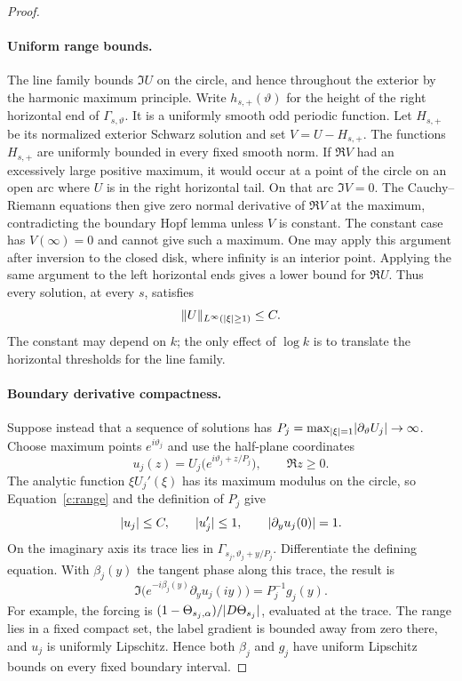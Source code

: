 \begin{proof}
\paragraph{Uniform range bounds.}
The line family bounds $\Im U$ on the circle, and hence throughout the
exterior by the harmonic maximum principle.  Write
$h_{s,+}(\vartheta)$ for the height of the right horizontal end of
$\Gamma_{s,\vartheta}$.  It is a uniformly smooth odd periodic function.
Let $H_{s,+}$ be its normalized exterior Schwarz solution and set
$V=U-H_{s,+}$.  The functions $H_{s,+}$ are uniformly bounded in every
fixed smooth norm.  If $\Re V$ had an excessively large positive
maximum, it would occur at a point of the circle on an open arc where
$U$ is in the right horizontal tail.  On that arc $\Im V=0$.
The Cauchy--Riemann equations then give zero normal derivative of
$\Re V$ at the maximum, contradicting the boundary Hopf lemma unless
$V$ is constant.  The constant case has $V(\infty)=0$ and cannot give
such a maximum.  One may apply this argument after inversion to the
closed disk, where infinity is an interior point.  Applying the same
argument to the left horizontal ends gives a lower bound for $\Re U$.
Thus every solution, at every $s$, satisfies
\begin{equation}\label{c:range}
 \lVert U\rVert_{L^\infty(\lvert\xi\rvert\ge1)}\le C.
\end{equation}
The constant may depend on $k$; the only effect of $\log k$ is to
translate the horizontal thresholds for the line family.

\paragraph{Boundary derivative compactness.}
Suppose instead that a sequence of solutions has
$P_j=\max_{\lvert\xi\rvert=1}\lvert\partial_\vartheta U_j\rvert\to\infty$.
Choose maximum points $e^{i\vartheta_j}$ and use the half-plane
coordinates
\[
 u_j(z)=U_j\bigl(e^{i\vartheta_j+z/P_j}\bigr),
 \qquad \Re z\ge0.
\]
The analytic function $\xi U_j'(\xi)$ has its maximum modulus on the
circle, so Equation~\eqref{c:range} and the definition of $P_j$ give
\[
 \lvert u_j\rvert\le C,\qquad \lvert u_j'\rvert\le1,
 \qquad \lvert\partial_yu_j(0)\rvert=1.
\]
On the imaginary axis its trace lies in
$\Gamma_{s_j,\vartheta_j+y/P_j}$.  Differentiate the defining equation.
With $\beta_j(y)$ the tangent phase along this trace, the result is
\begin{equation}\label{c:scaled-boundary}
 \Im\bigl(e^{-i\beta_j(y)}\partial_yu_j(iy)\bigr)
       =P_j^{-1}g_j(y).
\end{equation}
For example, the forcing is
$(1-\Theta_{s_j,\alpha})/\lvert D\Theta_{s_j}\rvert$, evaluated at the trace.
The range lies in a fixed compact set, the label gradient is bounded
away from zero there, and $u_j$ is uniformly Lipschitz.  Hence both
$\beta_j$ and $g_j$ have uniform Lipschitz bounds on every fixed boundary
interval.


\end{proof}
